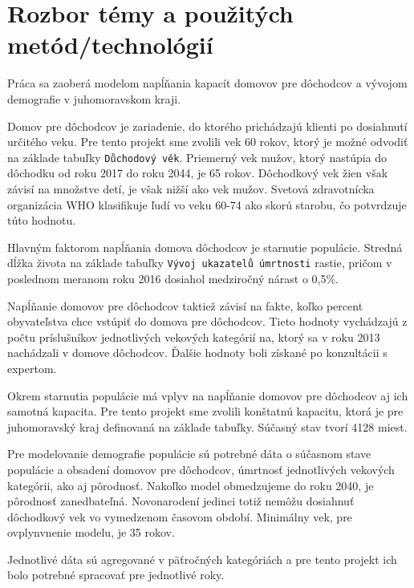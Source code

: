 \documentclass[a4paper, 11pt]{article}
\begin{document}
\section{Rozbor témy a použitých metód/technológií}
Práca sa zaoberá modelom napĺňania kapacít domovov pre dôchodcov a vývojom demografie v juhomoravskom kraji. 

Domov pre dôchodcov je zariadenie, do ktorého prichádzajú klienti po dosiahnutí určitého veku. Pre tento projekt sme zvolili vek 60 rokov, ktorý je možné odvodiť na základe tabuľky \texttt{Důchodový věk}\cite{duchod}. Priemerný vek mužov, ktorý nastúpia do dôchodku od roku 2017 do roku 2044, je 65 rokov. Dôchodkový vek žien však závisí na množstve detí, je však nižší ako vek mužov. Svetová zdravotnícka organizácia WHO klasifikuje ľudí vo veku 60-74 ako skorú starobu\cite{pac}, čo potvrdzuje túto hodnotu.

Hlavným faktorom napĺňania domova dôchodcov je starnutie populácie. Stredná dĺžka života na základe tabuľky \texttt{Vývoj ukazatelů úmrtnosti} \cite[str. 8]{zomreli} rastie, pričom v poslednom meranom roku 2016 dosiahol medziročný nárast o 0,5\%.

Napĺňanie domovov pre dôchodcov taktiež závisí na fakte, koľko percent obyvateľstva chce vstúpiť do domova pre dôchodcov. Tieto hodnoty vychádzajú z počtu príslušníkov jednotlivých vekových kategórií na, ktorý sa v roku 2013 nachádzali v domove dôchodcov\cite{domovy}. Ďalšie hodnoty boli získané po konzultácii s expertom.

Okrem starnutia populácie má vplyv na napĺňanie domovov pre dôchodcov aj ich samotná kapacita. Pre tento projekt sme zvolili konštatnú kapacitu, ktorá je pre juhomoravský kraj definovaná na základe tabuľky\cite{miesta}. Súčasný stav tvorí 4128 miest.  

Pre modelovanie demografie populácie sú potrebné dáta o súčasnom stave populácie\cite{demografia} a obsadení domovov pre dôchodcov\cite{domovy}, úmrtnosť jednotlivých vekových kategórii\cite{zomreli}, ako aj pôrodnosť. Nakoľko model obmedzujeme do roku 2040, je pôrodnosť zanedbateľná. Novonarodení jedinci totiž nemôžu dosiahnuť dôchodkový vek vo vymedzenom časovom období. Minimálny vek, pre ovplynvnenie modelu, je 35 rokov.

Jednotlivé dáta sú agregované v päťročných kategóriách a pre tento projekt ich bolo potrebné spracovať pre jednotlivé roky.

\end{document}
